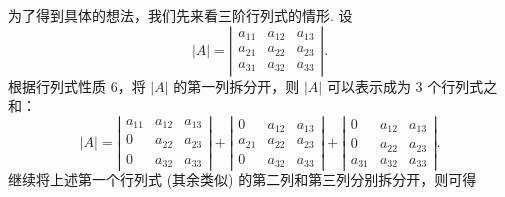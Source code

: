 \documentclass[UTF8,12pt,a4paper,fontset=fandol]{ctexart}
\begin{document}
为了得到具体的想法，我们先来看三阶行列式的情形. 设
\[
|A|=
\left|\begin{array}{ccc}
a_{11} & a_{12} & a_{13}\\
a_{21} & a_{22} & a_{23}\\
a_{31} & a_{32} & a_{33}
\end{array}\right|.
\]
根据行列式性质 6，将 $|A|$ 的第一列拆分开，则 $|A|$ 可以表示成为 3 个行列式之和：
\[
|A|=
\left|\begin{array}{ccc}
a_{11} & a_{12} & a_{13}\\
0 & a_{22} & a_{23}\\
0 & a_{32} & a_{33}
\end{array}\right|
+
\left|\begin{array}{ccc}
0 & a_{12} & a_{13}\\
a_{21} & a_{22} & a_{23}\\
0 & a_{32} & a_{33}
\end{array}\right|
+
\left|\begin{array}{ccc}
0 & a_{12} & a_{13}\\
0 & a_{22} & a_{23}\\
a_{31} & a_{32} & a_{33}
\end{array}\right|.
\]
继续将上述第一个行列式 (其余类似) 的第二列和第三列分别拆分开，则可得
\end{document}
